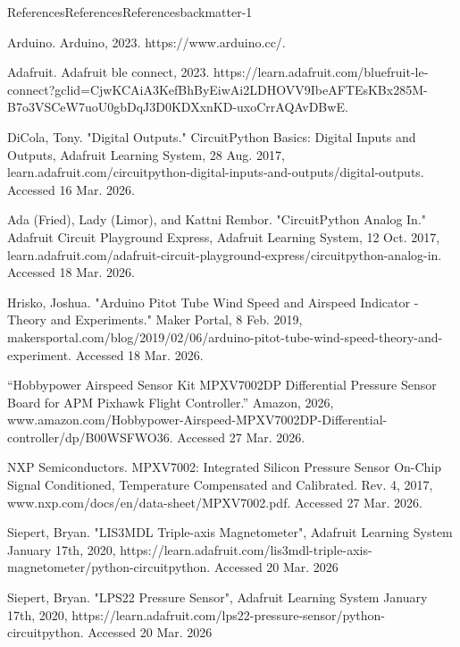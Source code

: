 \documentclass[oneside,10pt,]{book}
\numberwithin{equation}{section}
\begin{document}
\begin{references-chapter-numberless}{References}{References}{}{References}{}{}{backmatter-1}
\begin{referencelist}
\hypertarget{Arduino}{}Arduino. Arduino, 2023. https:\slash{}\slash{}www.arduino.cc\slash{}.%

\hypertarget{AdafruitBLE}{}Adafruit. Adafruit ble connect, 2023. https:\slash{}\slash{}learn.adafruit.com\slash{}bluefruit-le-connect?gclid=CjwKCAiA3KefBhByEiwAi2LDHOVV9IbeAFTEsKBx285M-B7o3VSCeW7uoU0gbDqJ3D0KDX\textunderscore{}xnKD-uxoCrrAQAvD\textunderscore{}BwE.%

\hypertarget{Metro}{}DiCola, Tony. "Digital Outputs." CircuitPython Basics: Digital Inputs and Outputs, Adafruit Learning System, 28 Aug. 2017, learn.adafruit.com\slash{}circuitpython-digital-inputs-and-outputs\slash{}digital-outputs. Accessed 16 Mar. 2026.%

\hypertarget{potentiometer}{}Ada (Fried), Lady (Limor), and Kattni Rembor. "CircuitPython Analog In." Adafruit Circuit Playground Express, Adafruit Learning System, 12 Oct. 2017, learn.adafruit.com\slash{}adafruit-circuit-playground-express\slash{}circuitpython-analog-in. Accessed 18 Mar. 2026.%

\hypertarget{pitot-author}{}Hrisko, Joshua. "Arduino Pitot Tube Wind Speed and Airspeed Indicator - Theory and Experiments." Maker Portal, 8 Feb. 2019, makersportal.com\slash{}blog\slash{}2019\slash{}02\slash{}06\slash{}arduino-pitot-tube-wind-speed-theory-and-experiment. Accessed 18 Mar. 2026.%

\hypertarget{pitot-amazon}{}“Hobbypower Airspeed Sensor Kit MPXV7002DP Differential Pressure Sensor Board for APM Pixhawk Flight Controller.” Amazon, 2026, www.amazon.com\slash{}Hobbypower-Airspeed-MPXV7002DP-Differential-controller\slash{}dp\slash{}B00WSFWO36. Accessed 27 Mar. 2026.%

\hypertarget{pitot-datasheet}{}NXP Semiconductors. MPXV7002: Integrated Silicon Pressure Sensor On-Chip Signal Conditioned, Temperature Compensated and Calibrated. Rev. 4, 2017, www.nxp.com\slash{}docs\slash{}en\slash{}data-sheet\slash{}MPXV7002.pdf. Accessed 27 Mar. 2026.%

\hypertarget{imu-wiring}{}Siepert, Bryan. "LIS3MDL Triple-axis Magnetometer", Adafruit Learning System January 17th, 2020, https:\slash{}\slash{}learn.adafruit.com\slash{}lis3mdl-triple-axis-magnetometer\slash{}python-circuitpython. Accessed 20 Mar. 2026%

\hypertarget{pressure-wiring}{}Siepert, Bryan. "LPS22 Pressure Sensor", Adafruit Learning System January 17th, 2020, https:\slash{}\slash{}learn.adafruit.com\slash{}lps22-pressure-sensor\slash{}python-circuitpython. Accessed 20 Mar. 2026%


\end{referencelist}
\end{references-chapter-numberless}
\end{document}
